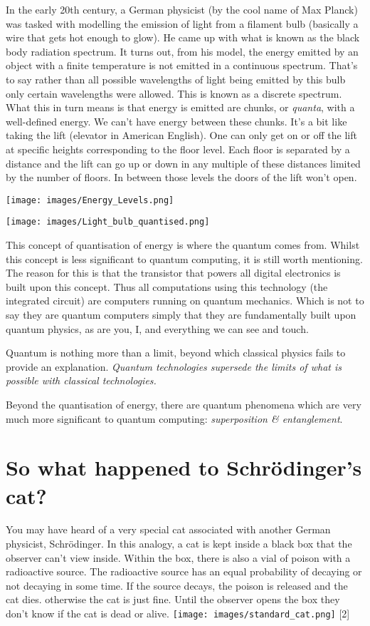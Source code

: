 \documentclass{book}
\begin{document}
In the early 20th century, a German physicist (by the cool name of Max Planck) was tasked with modelling the emission of light from a filament bulb (basically a wire that gets hot enough to glow). He came up with what is known as the black body radiation spectrum. It turns out, from his model, the energy emitted by an object with a finite temperature is not emitted in a continuous spectrum. That's to say rather than all possible wavelengths of light being emitted by this bulb only certain wavelengths were allowed. This is known as a discrete spectrum. What this in turn means is that energy is emitted are chunks, or \textit{quanta}, with a well-defined energy. We can't have energy between these chunks. It's a bit like taking the lift (elevator in American English). One can only get on or off the lift at specific heights corresponding to the floor level. Each floor is separated by a distance and the lift can go up or down in any multiple of these distances limited by the number of floors. In between those levels the doors of the lift won't open.

\texttt{[image: images/Energy\_Levels.png]}

\texttt{[image: images/Light\_bulb\_quantised.png]}

This concept of quantisation of energy is where the quantum comes from. Whilst this concept is less significant to quantum computing, it is still worth mentioning. The reason for this is that the transistor that powers all digital electronics is built upon this concept. Thus all computations using this technology (the integrated circuit) are computers running on quantum mechanics. Which is not to say they are quantum computers simply that they are fundamentally built upon quantum physics, as are you, I, and everything we can see and touch. 

Quantum is nothing more than a limit, beyond which classical physics fails to provide an explanation. \textit{Quantum technologies supersede the limits of what is possible with classical technologies.}

Beyond the quantisation of energy, there are quantum phenomena which are very much more significant to quantum computing: \textit{superposition \& entanglement}. 

\section{So what happened to Schrödinger’s cat?}

You may have heard of a very special cat associated with another German physicist, Schrödinger. In this analogy, a cat is kept inside a black box that the observer can't view inside. Within the box, there is also a vial of poison with a radioactive source. The radioactive source has an equal probability of decaying or not decaying in some time. If the source decays, the poison is released and the cat dies. otherwise the cat is just fine. Until the observer opens the box they don't know if the cat is dead or alive. 
\texttt{[image: images/standard\_cat.png]}
[2]
\end{document}
